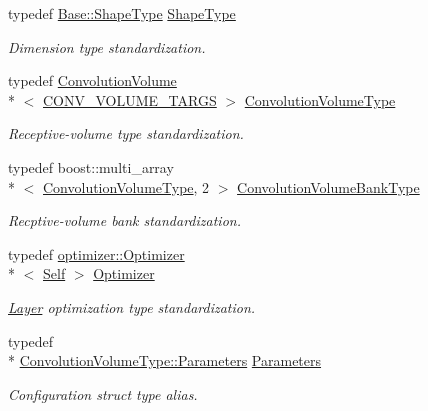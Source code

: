 \begin{DoxyCompactItemize}
typedef \hyperlink{classffnn_1_1layer_1_1_hidden_abdfcf81b3846fae3b19a207424695df0}{Base\-::\-Shape\-Type} \hyperlink{classffnn_1_1layer_1_1_convolution_af048fd677e8749bb295fac8d330ad843}{Shape\-Type}
\begin{DoxyCompactList}\small\item\em Dimension type standardization. \end{DoxyCompactList}\item 
typedef \hyperlink{classffnn_1_1layer_1_1_convolution_volume}{Convolution\-Volume}\\*
$<$ \hyperlink{convolution_8h_a054b25d3efc67e1baaedfbc7305f8f50}{C\-O\-N\-V\-\_\-\-V\-O\-L\-U\-M\-E\-\_\-\-T\-A\-R\-G\-S} $>$ \hyperlink{classffnn_1_1layer_1_1_convolution_afce446070a9d86d22f6b5b53fef7c7d0}{Convolution\-Volume\-Type}
\begin{DoxyCompactList}\small\item\em Receptive-\/volume type standardization. \end{DoxyCompactList}\item 
typedef boost\-::multi\-\_\-array\\*
$<$ \hyperlink{classffnn_1_1layer_1_1_convolution_afce446070a9d86d22f6b5b53fef7c7d0}{Convolution\-Volume\-Type}, 2 $>$ \hyperlink{classffnn_1_1layer_1_1_convolution_a9cec43e24f084c141c0cc8ae3c046ff4}{Convolution\-Volume\-Bank\-Type}
\begin{DoxyCompactList}\small\item\em Recptive-\/volume bank standardization. \end{DoxyCompactList}\item 
typedef \hyperlink{classffnn_1_1optimizer_1_1_optimizer}{optimizer\-::\-Optimizer}\\*
$<$ \hyperlink{classffnn_1_1layer_1_1_convolution_ae8b56bc2a6dbd4642a25210b1595f51c}{Self} $>$ \hyperlink{classffnn_1_1layer_1_1_convolution_a4f65a386b5e7803b1413b546215cefa3}{Optimizer}
\begin{DoxyCompactList}\small\item\em \hyperlink{classffnn_1_1layer_1_1_layer}{Layer} optimization type standardization. \end{DoxyCompactList}\item 
typedef \\*
\hyperlink{structffnn_1_1layer_1_1_convolution_volume_1_1_parameters}{Convolution\-Volume\-Type\-::\-Parameters} \hyperlink{classffnn_1_1layer_1_1_convolution_afba43aa5946f49d3ffc306972ba11fff}{Parameters}
\begin{DoxyCompactList}\small\item\em Configuration struct type alias. \end{DoxyCompactList}\end{DoxyCompactItemize}
